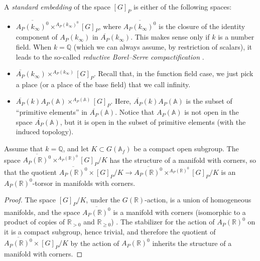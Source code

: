 \begin{definition}
 \label{definition-standard-embedding}
A {\it standard embedding} of the space $[G]_P$ is either of the following spaces:
\begin{itemize} 
 \item $\overline{A_P(k_\infty)^0} \times^{A_P(k_\infty)^0} [G]_P$, where $\overline{A_P(k_\infty)^0}$ is the closure of the identity component of $A_P(k_\infty)$ in $\overline{A_P}(k_\infty)$. This makes sense only if $k$ is a number field. When $k=\mathbb Q$ (which we can always assume, by restriction of scalars), it leads to the so-called \emph{reductive Borel--Serre compactification} \cite{Zucker-L2, Borel-Ji}. 
 \item $\overline{A_P}(k_\infty) \times^{A_P(k_\infty)} [G]_P$. Recall that, in the function field case, we just pick a place (or a place of the base field) that we call infinity.
 \item $\overline{A_P}(k)A_P(\mathbb A) \times^{A_P(\mathbb A)} [G]_P$. Here, $\overline{A_P}(k)A_P(\mathbb A)$ is the subset of ``primitive elements'' in $\overline{A_P}(\mathbb A)$. Notice that $A_P(\mathbb A)$ is not open in the space $\overline{A_P}(\mathbb A)$, but it is open in the subset of primitive elements (with the induced topology). 
\end{itemize}
\end{definition}



\begin{lemma}
 \label{lemma-manifold-corners}
Assume that $k=\mathbb Q$, and let $K\subset G(\mathbb A_f)$ be a compact open subgroup. The space $\overline{A_P(\mathbb R)^0} \times^{A_P(\mathbb R)^0} [G]_P/K$ has the structure of a manifold with corners, so that the quotient $\overline{A_P(\mathbb R)^0} \times [G]_P/K \to \overline{A_P(\mathbb R)^0} \times^{A_P(\mathbb R)^0} [G]_P/K$ is an ${A_P(\mathbb R)^0}$-torsor in manifolds with corners. 
\end{lemma}

\begin{proof}
 The space $[G]_P/K$, under the $G(\mathbb R)$-action, is a union of homogeneous manifolds, and the space $\overline{A_P(\mathbb R)^0}$ is a manifold with corners (isomorphic to a product of copies of $\mathbb R_{>0}$ and $\mathbb R_{\ge 0}$) . The stabilizer for the action of $A_P(\mathbb R)^0$ on it is a compact subgroup, hence trivial, and therefore the quotient of $\overline{A_P(\mathbb R)^0} \times [G]_P/K$ by the action of $A_P(\mathbb R)^0$ inherits the structure of a manifold with corners.
\end{proof}

